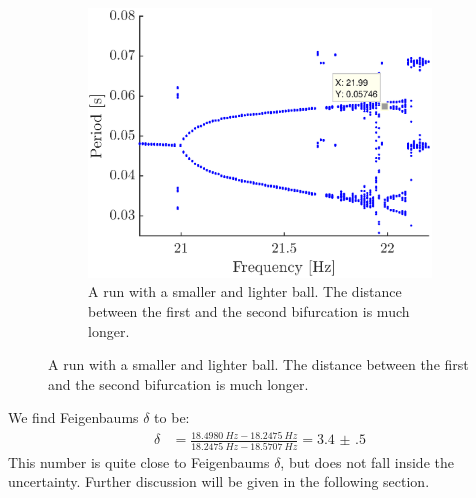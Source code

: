 \documentclass[12pt,oneside,a4paper]{article}
\numberwithin{equation}{section}
\begin{document}
{{{{\begin{figure}[h]
\begin{subfigure}[t]{0.49\textwidth}
\centering
\includegraphics[width=\textwidth]{long}
\caption{A run with a smaller and lighter ball. The distance between the first and the second bifurcation is much longer.}
\label{long}
\end{subfigure}
\end{figure}
We find Feigenbaums $\delta$ to be:
\begin{align}
\delta &= \frac{\SI{18.4980}{Hz}-\SI{18.2475}{Hz}}{\SI{18.2475}{Hz}-\SI{18.5707}{Hz}} = \num{3.4(5)}
\end{align}
This number is quite close to Feigenbaums $\delta$, but does not fall inside the uncertainty. Further discussion will be given in the following section.  
}}}}
\end{document}
